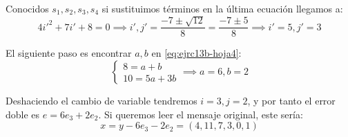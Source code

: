 \begin{problem}[13]
Conocidos $s_1,s_2,s_3,s_4$ si sustituimos términos en la última ecuación llegamos a:
\[4i'^2 + 7i' + 8 = 0 \implies i',j'= \frac{-7\pm \sqrt{12}}{8} = \frac{-7 \pm 5}{8} \implies i'=5, j'=3\]

El siguiente paso es encontrar $a,b$ en \ref{eq:ejrc13b-hoja4}:
\[
	\left\{ \begin{array}{l}
		8 = a+b\\
		10 = 5a + 3b
	\end{array}\right.
	\implies a=6,b=2
\]

Deshaciendo el cambio de variable tendremos $i=3,j=2$, y por tanto el error doble es $e=6e_3+2e_2$. Si queremos leer el mensaje original, este sería:
\[x = y - 6e_3 - 2e_2 = (4,11,7,3,0,1)\]

\spart


\spart
\end{problem}

